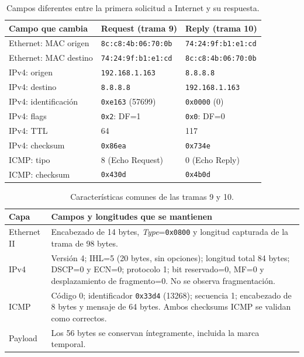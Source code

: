 \documentclass[12pt,a4paper]{article}
\begin{document}
\begin{table}[H]
\centering\small
\setlength{\tabcolsep}{4pt}
\begin{tabular}{@{}p{4.5cm}p{5.1cm}p{5.1cm}@{}}
\toprule
\textbf{Campo que cambia} & \textbf{Request (trama 9)} & \textbf{Reply (trama 10)} \\
\midrule
Ethernet: MAC origen & \texttt{8c:c8:4b:06:70:0b} & \texttt{74:24:9f:b1:e1:cd} \\
Ethernet: MAC destino & \texttt{74:24:9f:b1:e1:cd} & \texttt{8c:c8:4b:06:70:0b} \\
IPv4: origen & \texttt{192.168.1.163} & \texttt{8.8.8.8} \\
IPv4: destino & \texttt{8.8.8.8} & \texttt{192.168.1.163} \\
IPv4: identificación & \texttt{0xe163} (57699) & \texttt{0x0000} (0) \\
IPv4: flags & \texttt{0x2}: DF=1 & \texttt{0x0}: DF=0 \\
IPv4: TTL & 64 & 117 \\
IPv4: checksum & \texttt{0x86ea} & \texttt{0x734e} \\
ICMP: tipo & 8 (Echo Request) & 0 (Echo Reply) \\
ICMP: checksum & \texttt{0x430d} & \texttt{0x4b0d} \\
\bottomrule
\end{tabular}
\caption{Campos diferentes entre la primera solicitud a Internet y su respuesta.}
\label{tab:icmp-cambios}
\end{table}

\begin{table}[H]
\centering\small
\begin{tabular}{@{}p{3cm}p{11.7cm}@{}}
\toprule
\textbf{Capa} & \textbf{Campos y longitudes que se mantienen} \\
\midrule
Ethernet II & Encabezado de 14 bytes, \emph{Type}=\texttt{0x0800} y longitud
capturada de la trama de 98 bytes. \\
IPv4 & Versión 4; IHL=5 (20 bytes, sin opciones); longitud total 84 bytes;
DSCP=0 y ECN=0; protocolo 1; bit reservado=0, MF=0 y desplazamiento de
fragmento=0. No se observa fragmentación. \\
ICMP & Código 0; identificador \texttt{0x33d4} (13268); secuencia 1;
encabezado de 8 bytes y mensaje de 64 bytes. Ambos checksums ICMP se
validan como correctos. \\
Payload & Los 56 bytes se conservan íntegramente, incluida la marca temporal. \\
\bottomrule
\end{tabular}
\caption{Características comunes de las tramas 9 y 10.}
\label{tab:icmp-constantes}
\end{table}
\end{document}
